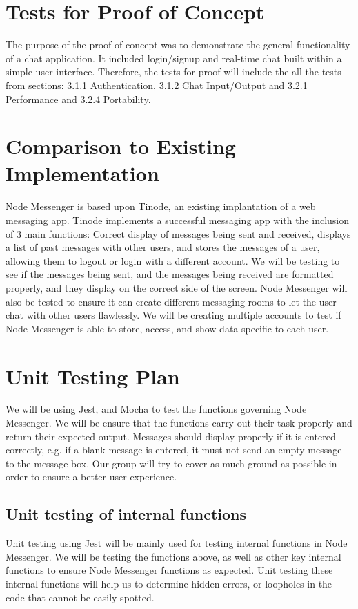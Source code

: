 \documentclass[12pt, titlepage]{article}
\begin{document}
\section{Tests for Proof of Concept}

The purpose of the proof of concept was to demonstrate the general functionality of a chat application. It included login/signup and real-time chat built within a simple user interface. Therefore, the tests for proof will include the all the tests from sections: 3.1.1 Authentication, 3.1.2 Chat Input/Output and 3.2.1 Performance and 3.2.4 Portability.


	
\section{Comparison to Existing Implementation}	
Node Messenger is based upon Tinode, an existing implantation of a web messaging app. Tinode implements a successful messaging app with the inclusion of 3 main functions: Correct display of messages being sent and received, displays a list of past messages with other users, and stores the messages of a user, allowing them to logout or login with a different account. We will be testing to see if the messages being sent, and the messages being received are formatted properly, and they display on the correct side of the screen. Node Messenger will also be tested to ensure it can create different messaging rooms to let the user chat with other users flawlessly. We will be creating multiple accounts to test if Node Messenger is able to store, access, and show data specific to each user.  
				
\section{Unit Testing Plan}
We will be using Jest, and Mocha to test the functions governing Node Messenger. We will be ensure that the functions carry out their task properly and return their expected output.  Messages should display properly if it is entered correctly, e.g. if a blank message is entered, it must not send an empty message to the message box. Our group will try to cover as much ground as possible in order to ensure a better user experience. 
		
\subsection{Unit testing of internal functions}
Unit testing using Jest will be mainly used for testing internal functions in Node Messenger. We will be testing the functions above, as well as other key internal functions to ensure Node Messenger functions as expected. Unit testing these internal functions will help us to determine hidden errors, or loopholes in the code that cannot be easily spotted.
\end{document}
